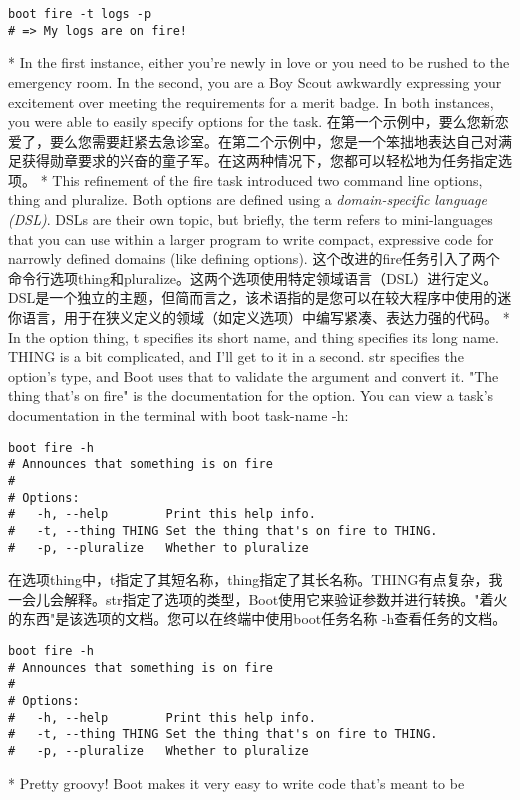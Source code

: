 \begin{paracol}{2}
\begin{verbatim}
boot fire -t logs -p
# => My logs are on fire!
\end{verbatim}
\switchcolumn[0]*
In the first instance, either you're newly in love or you need to be
rushed to the emergency room. In the second, you are a Boy Scout
awkwardly expressing your excitement over meeting the requirements for a
merit badge. In both instances, you were able to easily specify options
for the task.
\switchcolumn
在第一个示例中，要么您新恋爱了，要么您需要赶紧去急诊室。在第二个示例中，您是一个笨拙地表达自己对满足获得勋章要求的兴奋的童子军。在这两种情况下，您都可以轻松地为任务指定选项。
\switchcolumn[0]*
This refinement of the fire task introduced two command line options,
thing and pluralize. Both options are defined using a
\emph{domain-specific language (DSL)}. DSLs are their own topic, but
briefly, the term refers to mini-languages that you can use within a
larger program to write compact, expressive code for narrowly defined
domains (like defining options).
\switchcolumn
这个改进的fire任务引入了两个命令行选项thing和pluralize。这两个选项使用特定领域语言（DSL）进行定义。DSL是一个独立的主题，但简而言之，该术语指的是您可以在较大程序中使用的迷你语言，用于在狭义定义的领域（如定义选项）中编写紧凑、表达力强的代码。
\switchcolumn[0]*
In the option thing, t specifies its short name, and thing specifies its
long name. THING is a bit complicated, and I'll get to it in a second.
str specifies the option's type, and Boot uses that to validate the
argument and convert it. "The thing that's on fire" is the documentation
for the option. You can view a task's documentation in the terminal with
boot task-name -h:
\begin{verbatim}
boot fire -h
# Announces that something is on fire
#
# Options:
#   -h, --help        Print this help info.
#   -t, --thing THING Set the thing that's on fire to THING.
#   -p, --pluralize   Whether to pluralize
\end{verbatim}
\switchcolumn
在选项thing中，t指定了其短名称，thing指定了其长名称。THING有点复杂，我一会儿会解释。str指定了选项的类型，Boot使用它来验证参数并进行转换。"着火的东西"是该选项的文档。您可以在终端中使用boot任务名称 -h查看任务的文档。
\begin{verbatim}
boot fire -h
# Announces that something is on fire
#
# Options:
#   -h, --help        Print this help info.
#   -t, --thing THING Set the thing that's on fire to THING.
#   -p, --pluralize   Whether to pluralize
\end{verbatim}
\switchcolumn[0]*
Pretty groovy! Boot makes it very easy to write code that's meant to be

\end{paracol}
